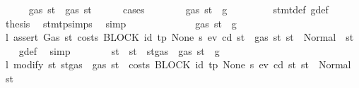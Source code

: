 \begin{isabellebody}
\ \ \ \ \isamarkupfalse%
\ {\isachardoublequoteopen}gas\ st{}{\isacharprime}{\kern0pt}\ {\isasymle}\ gas\ st{\isachardoublequoteclose}\isanewline
\ \ \ \ \isamarkupfalse%
\ cases\isanewline
\ \ \ \ \ \ \isamarkupfalse%
\ {\isachardoublequoteopen}gas\ st\ {\isasymle}\ g{\isachardoublequoteclose}\isanewline
\ \ \ \ \ \ \isamarkupfalse%
\ {}\ stmt{\isacharunderscore}{\kern0pt}def\ g{\isacharunderscore}{\kern0pt}def\ \isamarkupfalse%
\ {\isacharquery}{\kern0pt}thesis\ \isamarkupfalse%
\ stmt{\isachardot}{\kern0pt}psimps{\isacharparenleft}{\kern0pt}{}{\isacharparenright}{\kern0pt}\ \isamarkupfalse%
\ simp\isanewline
\ \ \ \ \isamarkupfalse%
\isanewline
\ \ \ \ \ \ \isamarkupfalse%
\ {\isachardoublequoteopen}{\isasymnot}\ gas\ st\ {\isasymle}\ g{\isachardoublequoteclose}\isanewline
\ \ \ \ \ \ \isamarkupfalse%
\ \isamarkupfalse%
\ l{}{\isacharcolon}{\kern0pt}\ {\isachardoublequoteopen}assert\ Gas\ {\isacharparenleft}{\kern0pt}{\isasymlambda}st{\isachardot}{\kern0pt}\ costs\ {\isacharparenleft}{\kern0pt}BLOCK\ {\isacharparenleft}{\kern0pt}{\isacharparenleft}{\kern0pt}id{}{\isacharcomma}{\kern0pt}\ tp{\isacharparenright}{\kern0pt}{\isacharcomma}{\kern0pt}\ None{\isacharparenright}{\kern0pt}\ s{\isacharparenright}{\kern0pt}\ e\isactrlsub v\ cd\ st\ {\isacharless}{\kern0pt}\ gas\ st{\isacharparenright}{\kern0pt}\ st\ {\isacharequal}{\kern0pt}\ Normal\ {\isacharparenleft}{\kern0pt}{\isacharparenleft}{\kern0pt}{\isacharparenright}{\kern0pt}{\isacharcomma}{\kern0pt}\ st{\isacharparenright}{\kern0pt}\ {\isachardoublequoteclose}\ \isamarkupfalse%
\ g{\isacharunderscore}{\kern0pt}def\ \isamarkupfalse%
\ simp\isanewline
\ \ \ \ \ \ \isamarkupfalse%
\ st{\isacharprime}{\kern0pt}\ \ {\isachardoublequoteopen}st{\isacharprime}{\kern0pt}\ {\isacharequal}{\kern0pt}\ st{\isasymlparr}gas\ {\isacharcolon}{\kern0pt}{\isacharequal}{\kern0pt}\ gas\ st\ {\isacharminus}{\kern0pt}\ g{\isasymrparr}{\isachardoublequoteclose}\isanewline
\ \ \ \ \ \ \isamarkupfalse%
\ \isamarkupfalse%
\ l{}{\isacharcolon}{\kern0pt}\ {\isachardoublequoteopen}modify\ {\isacharparenleft}{\kern0pt}{\isasymlambda}st{\isachardot}{\kern0pt}\ st{\isasymlparr}gas\ {\isacharcolon}{\kern0pt}{\isacharequal}{\kern0pt}\ gas\ st\ {\isacharminus}{\kern0pt}\ costs\ {\isacharparenleft}{\kern0pt}BLOCK\ {\isacharparenleft}{\kern0pt}{\isacharparenleft}{\kern0pt}id{}{\isacharcomma}{\kern0pt}\ tp{\isacharparenright}{\kern0pt}{\isacharcomma}{\kern0pt}\ None{\isacharparenright}{\kern0pt}\ s{\isacharparenright}{\kern0pt}\ e\isactrlsub v\ cd\ st{\isasymrparr}{\isacharparenright}{\kern0pt}\ st\ {\isacharequal}{\kern0pt}\ Normal\ {\isacharparenleft}{\kern0pt}{\isacharparenleft}{\kern0pt}{\isacharparenright}{\kern0pt}{\isacharcomma}{\kern0pt}\ st{\isacharprime}{\kern0pt}{\isacharparenright}{\kern0pt}{\isachardoublequoteclose}\ \isamarkupfalse%

\end{isabellebody}
